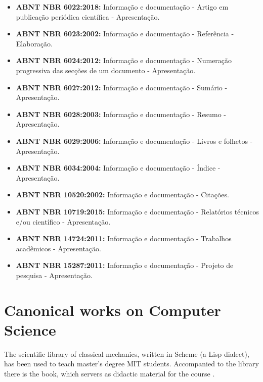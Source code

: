 \documentclass[
12pt,				%
openright,			%
oneside,			%
a4paper,			%
brazil,				%
english,			%
]{abntex2}
\begin{document}
\begin{itemize}
\item \textbf{ABNT NBR 6022:2018:} Informação e documentação -
  Artigo em publicação periódica científica - Apresentação.
\item \textbf{ABNT NBR 6023:2002:} Informação e documentação -
  Referência - Elaboração.
\item \textbf{ABNT NBR 6024:2012:} Informação e documentação -
  Numeração progressiva das secções de um documento - Apresentação.
\item \textbf{ABNT NBR 6027:2012:} Informação e documentação -
  Sumário - Apresentação.
\item \textbf{ABNT NBR 6028:2003:} Informação e documentação -
  Resumo - Apresentação.
\item \textbf{ABNT NBR 6029:2006:} Informação e documentação -
  Livros e folhetos - Apresentação.
\item \textbf{ABNT NBR 6034:2004:} Informação e documentação -
  Índice - Apresentação.
\item \textbf{ABNT NBR 10520:2002:} Informação e documentação -
  Citações.
\item \textbf{ABNT NBR 10719:2015:} Informação e documentação -
  Relatórios técnicos e/ou científico - Apresentação.
\item \textbf{ABNT NBR 14724:2011:} Informação e documentação -
  Trabalhos acadêmicos - Apresentação.
\item \textbf{ABNT NBR 15287:2011:} Informação e documentação -
  Projeto de pesquisa - Apresentação.
\end{itemize}

\section{Canonical works on Computer Science}
\label{sec:scim}
The scientific library of classical mechanics, written in Scheme (a
Lisp dialect), has been used to teach master's degree MIT
students. Accompanied to the library there is the book, which servers
as didactic material for the course \cite{sussman2015structure}.
\end{document}
